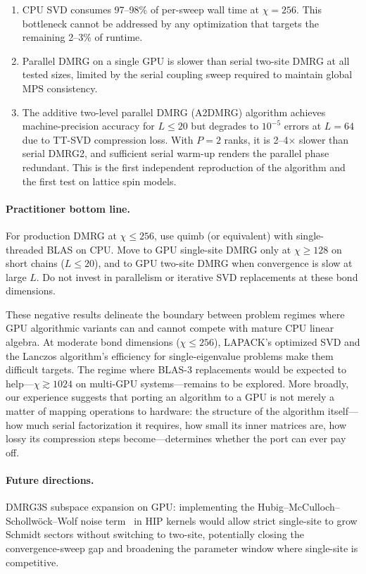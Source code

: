 \documentclass[preprint,12pt]{elsarticle}
\begin{document}
\begin{enumerate}
  \item CPU SVD consumes 97--98\% of per-sweep wall time at $\chi = 256$.
  This bottleneck cannot be addressed by any optimization that targets the remaining 2--3\% of runtime.

  \item Parallel DMRG on a single GPU is slower than serial two-site DMRG at all tested sizes, limited by the serial coupling sweep required to maintain global MPS consistency.

  \item The additive two-level parallel DMRG (A2DMRG) algorithm \cite{Grigori2025} achieves machine-precision accuracy for $L \leq 20$ but degrades to $10^{-5}$ errors at $L = 64$ due to TT-SVD compression loss.
  With $P = 2$ ranks, it is 2--4$\times$ slower than serial DMRG2, and sufficient serial warm-up renders the parallel phase redundant.
  This is the first independent reproduction of the algorithm and the first test on lattice spin models.
\end{enumerate}

\paragraph{Practitioner bottom line.}
For production DMRG at $\chi \leq 256$, use quimb (or equivalent) with single-threaded BLAS on CPU.
Move to GPU single-site DMRG only at $\chi \geq 128$ on short chains ($L \leq 20$), and to GPU two-site DMRG when convergence is slow at large $L$.
Do not invest in parallelism or iterative SVD replacements at these bond dimensions.

These negative results delineate the boundary between problem regimes where GPU algorithmic variants can and cannot compete with mature CPU linear algebra.
At moderate bond dimensions ($\chi \leq 256$), LAPACK's optimized SVD and the Lanczos algorithm's efficiency for single-eigenvalue problems make them difficult targets.
The regime where BLAS-3 replacements would be expected to help---$\chi \gtrsim 1024$ on multi-GPU systems---remains to be explored.
More broadly, our experience suggests that porting an algorithm to a GPU is not merely a matter of mapping operations to hardware: the structure of the algorithm itself---how much serial factorization it requires, how small its inner matrices are, how lossy its compression steps become---determines whether the port can ever pay off.

\paragraph{Future directions.}
DMRG3S subspace expansion on GPU: implementing the Hubig--McCulloch--Schollw{\"o}ck--Wolf noise term~\cite{Hubig2015} in HIP kernels would allow strict single-site to grow Schmidt sectors without switching to two-site, potentially closing the convergence-sweep gap and broadening the parameter window where single-site is competitive.
\end{document}
